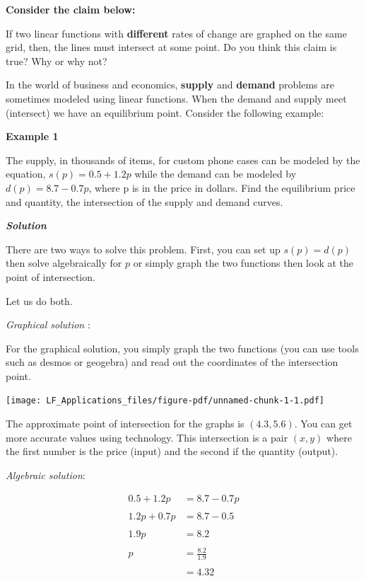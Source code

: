 \documentclass[
  letterpaper,
  DIV=11,
  numbers=noendperiod]{scrreprt}
\begin{document}
\textbf{Consider the claim below:}

If two linear functions with \textbf{different} rates of change are
graphed on the same grid, then, the lines must intersect at some point.
Do you think this claim is true? Why or why not?

In the world of business and economics, \textbf{supply} and
\textbf{demand} problems are sometimes modeled using linear functions.
When the demand and supply meet (intersect) we have an equilibrium
point. Consider the following example:

\textbf{Example 1}

The supply, in thousands of items, for custom phone cases can be modeled
by the equation, \(s(p)=0.5+1.2p\) while the demand can be modeled by
\(d(p)=8.7−0.7p\), where p is in the price in dollars. Find the
equilibrium price and quantity, the intersection of the supply and
demand curves.

\textbf{\emph{Solution}}

There are two ways to solve this problem. First, you can set up
\(s(p)=d(p)\) then solve algebraically for \(p\) or simply graph the two
functions then look at the point of intersection.

Let us do both.

\emph{Graphical solution} :

For the graphical solution, you simply graph the two functions (you can
use tools such as desmos or geogebra) and read out the coordinates of
the intersection point.

\texttt{[image: LF\_Applications\_files/figure-pdf/unnamed-chunk-1-1.pdf]}

The approximate point of intersection for the graphs is \((4.3,5.6)\).
You can get more accurate values using technology. This intersection is
a pair \((x,y)\) where the first number is the price (input) and the
second if the quantity (output).

\emph{Algebraic solution}:

\begin{align}
  0.5+1.2p&=8.7−0.7p\\ \\
  1.2p+0.7p&=8.7-0.5\\ \\
  1.9p&=8.2\\ \\
  p&=\frac{8.2}{1.9}\\ \\
  &=4.32
\end{align}
\end{document}
